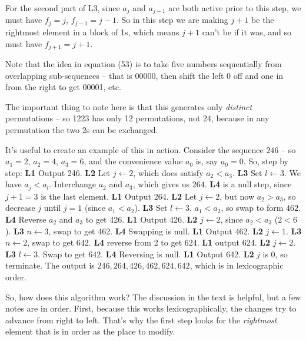 For the second part of L3, since $a_j$ and $a_{j-1}$ are both active
prior to this step, we must have $f_j = j$, $f_{j-1} = j - 1$.  So
in this step we are making $j+1$ be the rightmost element in a block of 1s,
which means $j+1$ can't be if it was, and so must have $f_{j+1} = j + 1$.


\noindent [p 302] Note that the idea in equation (53) is to take five
numbers sequentially from overlapping sub-sequences -- that is
00000, then shift the left 0 off and one in from the right to get 00001,
etc.


 The important thing to note here is that
this generates only {\it distinct} permutations -- so 1223 has only 12
permutations, not 24, because in any permutation the two 2s can be
exchanged.

It's useful to create an example of this
in action.  Consider the sequence $246$ -- so $a_1 = 2$, $a_2 = 4$,
$a_3 = 6$, and the convenience value $a_0$ is, say $a_0 = 0$.
So, step by step:\hfil\break
{\bf L1} Output 246.\hfil\break
{\bf L2} Let $j \leftarrow 2$, which does satisfy $a_2 < a_3$.\hfil\break
{\bf L3} Set $l \leftarrow 3$.  We have $a_j < a_l$.  Interchange
  $a_2$ and $a_3$, which gives us $264$.\hfil\break
{\bf L4} is a null step, since $j + 1 = 3$ is the last element.\hfil\break
{\bf L1} Output 264.\hfil\break
{\bf L2} Let $j \leftarrow 2$, but now $a_2 > a_3$, so decrease
  $j$ until $j = 1$ (since $a_1 < a_2$).\hfil\break
{\bf L3} Set $l \leftarrow 3$.  $a_1 < a_2$, so swap to form
 $462$.\hfil\break
{\bf L4} Reverse $a_2$ and $a_3$ to get 426.\hfil\break
{\bf L1} Output 426.\hfil\break
{\bf L2} $j \leftarrow 2$, since $a_2 < a_3$ ($2 < 6$).\hfil\break
{\bf L3} $n \leftarrow 3$, swap to get 462.\hfil\break
{\bf L4} Swapping is null.\hfil\break
{\bf L1} Output 462.\hfil\break
{\bf L2} $j \leftarrow 1$.\hfil\break
{\bf L3} $n \leftarrow 2$, swap to get $642$.\hfil\break
{\bf L4} reverse from 2 to get $624$.\hfil\break
{\bf L1} output 624.\hfil\break
{\bf L2} $j \leftarrow 2$.\hfil\break
{\bf L3} $l \leftarrow 3$.  Swap to get $642$.\hfil\break
{\bf L4} Reversing is null.\hfil\break
{\bf L1} Output 642.\hfil\break
{\bf L2} $j$ is 0, so terminate.\hfil\break
The output is ${246, 264, 426, 462, 624, 642}$, which is in lexicographic
order.

So, how does this algorithm work?  The discussion in the text is helpful, but
a few notes are in order.  First, because this works lexicographically, the
changes try to advance from right to left.  That's why the first step looks
for the {\it rightmost} element that is in order as the place to modify.

